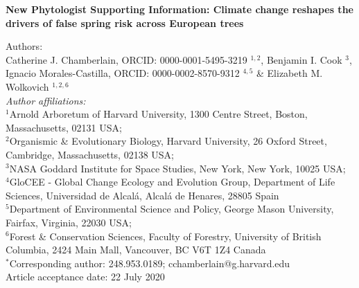 \documentclass{article}\usepackage[]{graphicx}\usepackage[]{color}
\begin{document}
\noindent 
\textbf{\LARGE{New Phytologist Supporting Information: Climate change reshapes the drivers of false spring risk across European trees}} 



\noindent Authors:\\
Catherine J. Chamberlain, ORCID: 0000-0001-5495-3219 $^{1,2}$, Benjamin I. Cook $^{3}$, Ignacio Morales-Castilla, ORCID: 0000-0002-8570-9312 $^{4,5}$ \& Elizabeth M. Wolkovich $^{1,2,6}$
\vspace{2ex}\\
\emph{Author affiliations:}\\
$^{1}$Arnold Arboretum of Harvard University, 1300 Centre Street, Boston, Massachusetts, 02131 USA; \\
$^{2}$Organismic \& Evolutionary Biology, Harvard University, 26 Oxford Street, Cambridge, Massachusetts, 02138 USA; \\
$^{3}$NASA Goddard Institute for Space Studies, New York, New York, 10025 USA; \\
$^{4}$GloCEE - Global Change Ecology and Evolution Group, Department of Life Sciences, Universidad de Alcal\'{a}, Alcal\'{a} de Henares, 28805 Spain \\
$^{5}$Department of Environmental Science and Policy, George Mason University, Fairfax, Virginia, 22030 USA; \\
$^{6}$Forest \& Conservation Sciences, Faculty of Forestry, University of British Columbia, 2424 Main Mall, Vancouver, BC V6T 1Z4 Canada\\
\vspace{2ex}
$^*$Corresponding author: 248.953.0189; cchamberlain@g.harvard.edu\\

\vspace{2ex}
Article acceptance date: 22 July 2020


\renewcommand{\thetable}{S\arabic{table}}
\renewcommand{\thefigure}{S\arabic{figure}}
\renewcommand{\labelitemi}{$-$}
\end{document}
